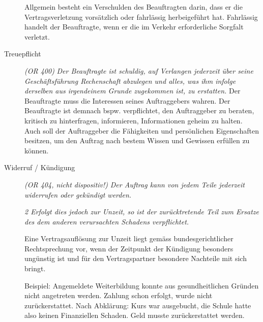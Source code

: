 \begin{description}
  Allgemein besteht ein Verschulden des Beauftragten darin, dass er die Vertragsverletzung vorsätzlich oder fahrlässig herbeigeführt hat. Fahrlässig handelt der Beauftragte, wenn er die im Verkehr erforderliche Sorgfalt verletzt.
  \item[Treuepflicht] \textit{(OR 400)}
  \textit{Der Beauftragte ist schuldig, auf Verlangen jederzeit über seine Geschäftsführung Rechenschaft abzulegen und alles, was ihm infolge derselben aus irgendeinem Grunde zugekommen ist, zu erstatten.}
  Der Beauftragte muss die Interessen seines Auftraggebers wahren. Der Beauftragte ist demnach bspw. verpflichtet, den Auftraggeber zu beraten, kritisch zu hinterfragen, informieren, Informationen geheim zu halten.
  Auch soll der Auftraggeber die Fähigkeiten und persönlichen Eigenschaften besitzen, um den Auftrag nach bestem Wissen und Gewissen erfüllen zu können.
  \item[Widerruf / Kündigung] \textit{(OR 404, nicht dispositiv!)}
  \textit{Der Auftrag kann von jedem Teile jederzeit widerrufen oder gekündigt werden.} 
  
  \textit{2 Erfolgt dies jedoch zur Unzeit, so ist der zurücktretende Teil zum Ersatze des dem anderen verursachten Schadens verpflichtet.}

  Eine Vertragsauflösung zur Unzeit liegt gemäss bundesgerichtlicher Rechtsprechung vor, wenn der Zeitpunkt der Kündigung besonders ungünstig ist und für den Vertragspartner besondere Nachteile mit sich bringt.

  Beispiel: Angemeldete Weiterbildung konnte aus gesundheitlichen Gründen nicht angetreten werden. Zahlung schon erfolgt, wurde nicht zurückerstattet. Nach Abklärung: Kurs war ausgebucht, die Schule hatte also keinen Finanziellen Schaden. Geld musste zurückerstattet werden.
\end{description}  